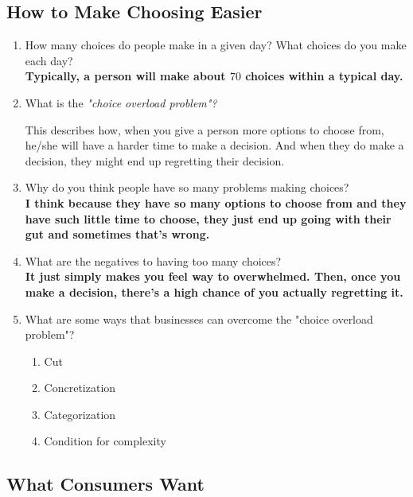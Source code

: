 \subsection{How to Make Choosing Easier}

\begin{enumerate}
  \item How many choices do people make in a given day? What choices do you make
    each day? \\
    \bf{Typically, a person will make about $70$ choices within a typical day.}
  \item What is the \it{"choice overload problem"}? \\
    \begin{definition}
      This describes how, when you give a person more options to choose from,
      he/she will have a harder time to make a decision. And when they do make a
      decision, they might end up regretting their decision.
    \end{definition}
  \item Why do you think people have so many problems making choices? \\
    \bf{I think because they have so many options to choose from and they have
    such little time to choose, they just end up going with their gut and
    sometimes that's wrong.}
  \item What are the negatives to having too many choices? \\
    \bf{It just simply makes you feel way to overwhelmed. Then, once you make a
    decision, there's a high chance of you actually regretting it.}
  \item What are some ways that businesses can overcome the "choice overload \\
    problem"? \\
    \begin{enumerate}
      \item Cut
      \item Concretization
      \item Categorization
      \item Condition for complexity
    \end{enumerate}
\end{enumerate}

\subsection{What Consumers Want}

